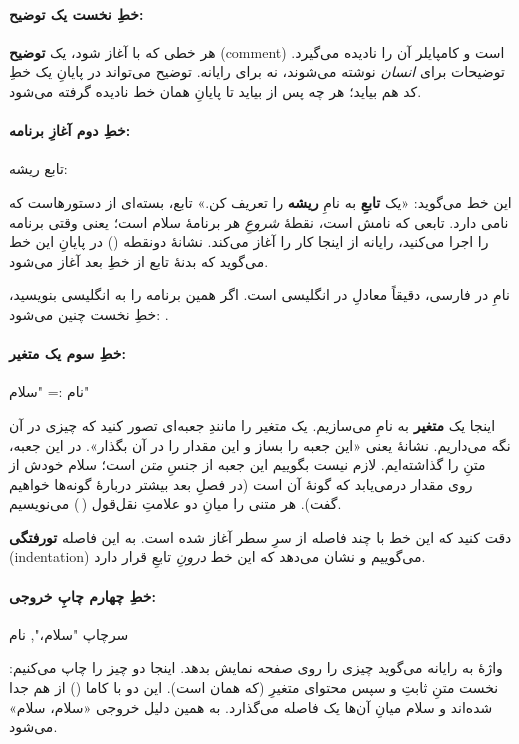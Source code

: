 \paragraph{خطِ نخست یک توضیح:}

هر خطی که با \code{//} آغاز شود، یک \textbf{توضیح} (comment) است و کامپایلر آن
را نادیده می‌گیرد. توضیحات برای \emph{انسان} نوشته می‌شوند، نه برای رایانه.
توضیح می‌تواند در پایانِ یک خطِ کد هم بیاید؛ هر چه پس از \code{//} بیاید تا
پایانِ همان خط نادیده گرفته می‌شود.

\paragraph{خطِ دوم آغازِ برنامه:}
\begin{salamfa}
تابع ریشه:
\end{salamfa}
این خط می‌گوید: «یک \textbf{تابعِ} به نامِ \textbf{ریشه} را تعریف کن.» تابع،
بسته‌ای از دستورهاست که نامی دارد. تابعی که نامش  است، نقطهٔ
\emph{شروعِ} هر برنامهٔ سلام است؛ یعنی وقتی برنامه را اجرا می‌کنید، رایانه از
اینجا کار را آغاز می‌کند. نشانهٔ دونقطه (\code{:}) در پایانِ این خط می‌گوید که
بدنهٔ تابع از خطِ بعد آغاز می‌شود.

\begin{note}
نامِ  در فارسی، دقیقاً معادلِ  در انگلیسی است. اگر همین
برنامه را به انگلیسی بنویسید، خطِ نخست چنین می‌شود: .
\end{note}

\paragraph{خطِ سوم یک متغیر:}
\begin{salamfa}
    نام := "سلام"
\end{salamfa}
اینجا یک \textbf{متغیر} به نامِ  می‌سازیم. یک متغیر را مانندِ
جعبه‌ای تصور کنید که چیزی در آن نگه می‌داریم. نشانهٔ \code{:=} یعنی «این جعبه
را بساز و این مقدار را در آن بگذار». در این جعبه، متنِ  را
گذاشته‌ایم. لازم نیست بگوییم این جعبه از جنسِ \emph{متن} است؛ سلام خودش از روی
مقدار درمی‌یابد که گونهٔ آن  است (در فصلِ بعد بیشتر دربارهٔ گونه‌ها
خواهیم گفت). هر متنی را میانِ دو علامتِ نقل‌قول (\,) می‌نویسیم.

دقت کنید که این خط با چند فاصله از سرِ سطر آغاز شده است. به این فاصله
\textbf{تورفتگی} (indentation) می‌گوییم و نشان می‌دهد که این خط \emph{درونِ}
تابعِ  قرار دارد.

\paragraph{خطِ چهارم چاپِ خروجی:}
\begin{salamfa}
    سرچاپ "سلام،", نام
\end{salamfa}
واژهٔ  به رایانه می‌گوید چیزی را روی صفحه نمایش بدهد. اینجا دو چیز
را چاپ می‌کنیم: نخست متنِ ثابتِ  و سپس محتوای متغیرِ 
(که همان  است). این دو با کاما (\code{,}) از هم جدا شده‌اند و سلام
میانِ آن‌ها یک فاصله می‌گذارد. به همین دلیل خروجی «سلام، سلام» می‌شود.

